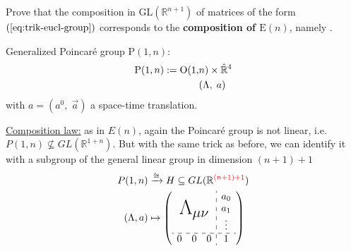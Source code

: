 \documentclass[../main.tex]{subfiles}
\begin{document}
\begin{exercise}
Prove that the composition in $\textrm{GL}(\mathbb{R}^{n+1})$ of matrices of the form $(\ref{eq:trik-eucl-group})$ corresponds to the \textbf{composition of $\textrm{E}(n)$}, namely .
\end{exercise}
\begin{example}
Generalized Poincaré group $\textrm{P}(1,n)$:
\[
\begin{split}
\textrm{P}(1,n):=\textrm{O}(1,&n)\times\hat{\mathbb{R}}^4\\
&\pqty{\Lambda,\;a}
\end{split}
\]
with $a=(a^0,\;\vec{a})$ a space-time translation.

\underline{Composition law:} as in $E(n)$, again the Poincaré group is not linear, i.e. $P(1,n)\not\subseteq GL(\mathbb{R}^{1+n})$. But with the same trick as before, we can identify it with a subgroup of the general linear group in dimension $(n+1)+1$
\begin{align*}
P(1,n)&\xrightarrow[]{\cong}H\subseteq GL(\mathbb{R}^{\color{red}(n+1)+1})\\
(\Lambda,a)&\mapsto
\left(
\begin{array}{ccc:c}
& &  &a_0\\
& \bigLambda &  &a_1\\
& &  &\vdots\\
\hdashline
0&0&0 &1\\
\end{array}
\right)
\end{align*}
\end{example}
\end{document}
